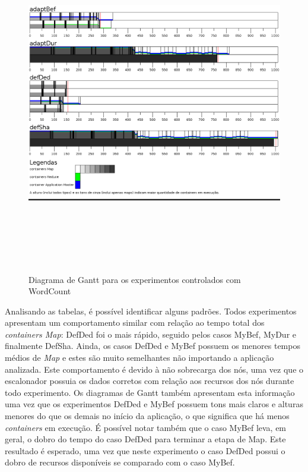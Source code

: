 \begin{figure}[!ht]
	\centering
	\includegraphics[height=15cm]{figuras/WC-simul.png}
	\caption{Diagrama de Gantt para os experimentos controlados com WordCount}
	\label{fig:exp1WC}
\end{figure}

Analisando as tabelas, é possível identificar alguns padrões. Todos experimentos apresentam um comportamento similar com relação ao tempo total dos \textit{containers Map}: DefDed foi o mais rápido, seguido pelos casos MyBef, MyDur e finalmente DefSha. Ainda, os casos DefDed e MyBef possuem os menores tempos médios de \textit{Map} e estes são muito semelhantes não importando a aplicação analizada. Este comportamento é devido à não sobrecarga dos nós, uma vez que o escalonador possuia os dados corretos com relação aos recursos dos nós durante todo experimento.
Os diagramas de Gantt também apresentam esta informação uma vez que os experimentos DefDed e MyBef possuem tons mais claros e alturas menores do que os demais no início da aplicação, o que significa que há menos \textit{containers} em execução. É possível notar também que o caso MyBef leva, em geral, o dobro do tempo do caso DefDed para terminar a etapa de Map. Este resultado é esperado, uma vez que neste experimento o caso DefDed possui o dobro de recursos disponíveis se comparado com o caso MyBef. 

